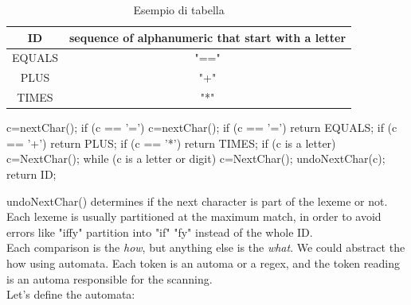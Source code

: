 \documentclass[12pt]{article}
\begin{document}
\begin{table}[ht]
	\centering
    \begin{tabular}{ | c | c | }
        \hline
        ID & sequence of alphanumeric that start with a letter \\ 
        \hline
        EQUALS & "==" \\ 
        \hline
        PLUS & "+" \\ 
        \hline
        TIMES & "*" \\ 
        \hline
    \end{tabular}
	\caption{Esempio di tabella}
\end{table}

\begin{mycode}[title= Imperative lexer]
    c=nextChar();
    if (c == '=') { c=nextChar(); if (c == '=') {return EQUALS;}}
    if (c == '+') { return PLUS; }
    if (c == '*') { return TIMES; }
    if (c is a letter) {
    c=NextChar();
    while (c is a letter or digit) { c=NextChar(); }
    undoNextChar(c);
    return ID;
}
\end{mycode}
undoNextChar() determines if the next character is part of the lexeme or not. Each lexeme is usually partitioned at the maximum match, in order to avoid errors like "iffy" partition into "if" "fy" instead of the whole ID.
\\ 
Each comparison is the \emph{how}, but anything else 
is the \emph{what}.
We could abstract the how using automata. 
Each token is an automa or a regex, and the token reading is an automa responsible for the scanning.
\\ 
Let's define the automata: 
\end{document}
